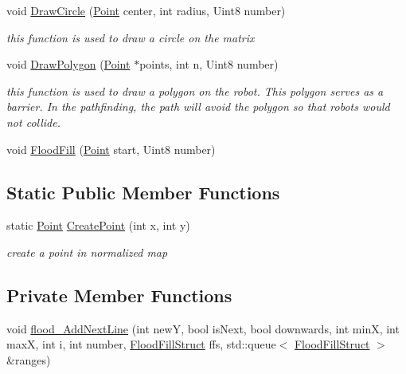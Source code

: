 \begin{DoxyCompactItemize}
void \hyperlink{classMatrix_a9dd7af97fcc825ca07a64b28050cb44f}{DrawCircle} (\hyperlink{structMatrix_1_1Point}{Point} center, int radius, Uint8 number)
\begin{DoxyCompactList}\small\item\em this function is used to draw a circle on the matrix \item\end{DoxyCompactList}\item 
void \hyperlink{classMatrix_a3b2f9c59a4cc8da933de12f4ccb867f6}{DrawPolygon} (\hyperlink{structMatrix_1_1Point}{Point} $\ast$points, int n, Uint8 number)
\begin{DoxyCompactList}\small\item\em this function is used to draw a polygon on the robot. This polygon serves as a barrier. In the pathfinding, the path will avoid the polygon so that robots would not collide. \item\end{DoxyCompactList}\item 
void \hyperlink{classMatrix_a7209ed0123ff3686f0d0f7f4e6ac7094}{FloodFill} (\hyperlink{structMatrix_1_1Point}{Point} start, Uint8 number)
\end{DoxyCompactItemize}
\subsection*{Static Public Member Functions}
\begin{DoxyCompactItemize}
\item 
static \hyperlink{structMatrix_1_1Point}{Point} \hyperlink{classMatrix_a39929c70aea7926beaf183b374239558}{CreatePoint} (int x, int y)
\begin{DoxyCompactList}\small\item\em create a point in normalized map \item\end{DoxyCompactList}\end{DoxyCompactItemize}
\subsection*{Private Member Functions}
\begin{DoxyCompactItemize}
\item 
void \hyperlink{classMatrix_aaa3962d9bf27f654bd6771a8d5bfaeac}{flood\_\-AddNextLine} (int newY, bool isNext, bool downwards, int minX, int maxX, int i, int number, \hyperlink{structMatrix_1_1FloodFillStruct}{FloodFillStruct} ffs, std::queue$<$ \hyperlink{structMatrix_1_1FloodFillStruct}{FloodFillStruct} $>$ \&ranges)
\end{DoxyCompactItemize}
